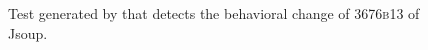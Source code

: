 \begin{figure}[h]
\centering
{}
\caption{Test generated by \DCII that detects the behavioral change of \textsc{3676b13} of Jsoup.}
\label{fig:ampl_jsoup}
\end{figure}

